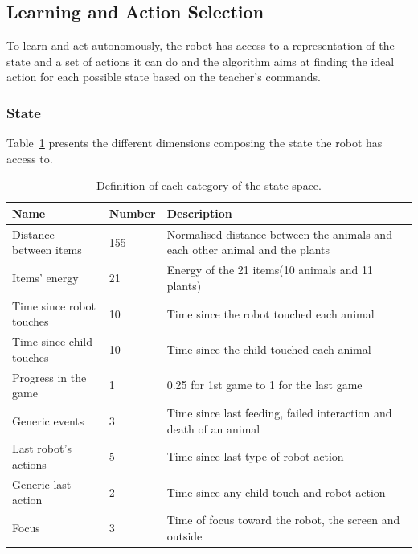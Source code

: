 
\subsection{Learning and Action Selection}

To learn and act autonomously, the robot has access to a representation of the state and a set of actions it can do and the algorithm aims at finding the ideal action for each possible state based on the teacher's commands.

\subsubsection{State}

Table~\ref{tab:tuto_state_space} presents the different dimensions composing the state the robot has access to.

\begin{table}[ht]
	\centering
	\caption{Definition of each category of the state space.}
	\label{tab:tuto_state_space}
	\begin{tabularx}{\textwidth}{@{}llX@{}}\toprule
		Name & Number & Description \\
		\midrule
		Distance between items & 155 & Normalised distance between the animals and each other animal and the plants\\
		Items' energy & 21 & Energy of the 21 items(10 animals and 11 plants)\\
		Time since robot touches & 10 & Time since the robot touched each animal\\ %
		Time since child touches & 10 & Time since the child touched each animal\\ %
		Progress in the game & 1 & 0.25 for 1st game to 1 for the last game\\ 
		Generic events & 3 & Time since last feeding, failed interaction and death of an animal\\ %
		Last robot's actions & 5 & Time since last type of robot action\\ %
		Generic last action & 2 & Time since any child touch and robot action\\ %
		Focus & 3 & Time of focus toward the robot, the screen and outside\\ %
		\bottomrule
	\end{tabularx}
\end{table}

